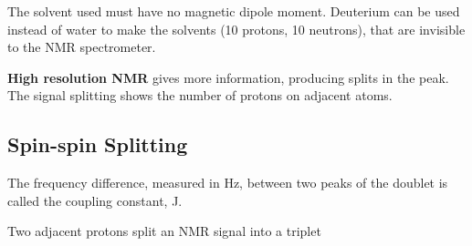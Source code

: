 	The solvent used must have no magnetic dipole moment. Deuterium can be used instead of water to make the solvents  (10 protons, 10 neutrons),  that are invisible to the NMR spectrometer.


	\textbf{High resolution NMR} gives more information, producing splits in the peak. The signal splitting shows the number of protons on adjacent atoms.

	\subsection{Spin-spin Splitting}
	
		The frequency difference, measured in Hz, between two peaks of the doublet is called the coupling constant, J.

		Two adjacent protons split an NMR signal into a triplet
